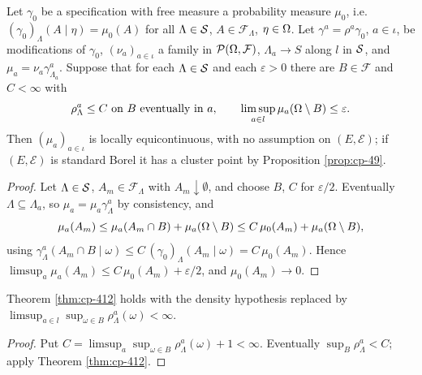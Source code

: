 \begin{theorem}[Georgii (4.12)]
    \label{thm:cp-412}
    \leanok

    Let $\gamma_0$ be a specification with free measure a probability measure $\mu_0$, i.e.\
    $(\gamma_0)_\Lambda(A \mid \eta) = \mu_0(A)$ for all $\Lambda \in \mathcal{S}$,
    $A \in \mathcal{F}_\Lambda$, $\eta \in \Omega$. Let $\gamma^a = \rho^a\gamma_0$, $a \in \iota$,
    be modifications of $\gamma_0$, $(\nu_a)_{a \in \iota}$ a family in
    $\mathcal{P}(\Omega, \mathcal{F})$, $\Lambda_a \to S$ along $l$ in $\mathcal{S}$, and
    $\mu_a = \nu_a \gamma^a_{\Lambda_a}$. Suppose that for each $\Lambda \in \mathcal{S}$ and each
    $\varepsilon > 0$ there are $B \in \mathcal{F}$ and $C < \infty$ with
    \[\rho^a_\Lambda \leq C \text{ on } B \text{ eventually in } a,
      \qquad
      \limsup_{a \in l} \mu_a(\Omega \setminus B) \leq \varepsilon.\]
    Then $(\mu_a)_{a \in \iota}$ is locally equicontinuous, with no assumption on
    $(E, \mathcal{E})$; if $(E, \mathcal{E})$ is standard Borel it has a cluster point by
    Proposition \ref{prop:cp-49}.
\end{theorem}
\begin{proof}
    \leanok

    Let $\Lambda \in \mathcal{S}$, $A_m \in \mathcal{F}_\Lambda$ with $A_m \downarrow \emptyset$, and
    choose $B$, $C$ for $\varepsilon/2$. Eventually $\Lambda \subseteq \Lambda_a$, so
    $\mu_a = \mu_a\gamma^a_\Lambda$ by consistency, and
    \[\mu_a(A_m) \leq \mu_a(A_m \cap B) + \mu_a(\Omega\setminus B)
      \leq C\,\mu_0(A_m) + \mu_a(\Omega \setminus B),\]
    using $\gamma^a_\Lambda(A_m \cap B \mid \omega) \leq C\,(\gamma_0)_\Lambda(A_m \mid \omega)
    = C\,\mu_0(A_m)$. Hence $\limsup_a \mu_a(A_m) \leq C\,\mu_0(A_m) + \varepsilon/2$, and
    $\mu_0(A_m) \to 0$.
\end{proof}

\begin{lemma}
    \label{lem:cp-412-limsup}
    \leanok

    Theorem \ref{thm:cp-412} holds with the density hypothesis replaced by
    $\limsup_{a \in l} \sup_{\omega \in B} \rho^a_\Lambda(\omega) < \infty$.
\end{lemma}
\begin{proof}
    \leanok

    Put $C = \limsup_a \sup_{\omega \in B}\rho^a_\Lambda(\omega) + 1 < \infty$. Eventually
    $\sup_B \rho^a_\Lambda < C$; apply Theorem \ref{thm:cp-412}.
\end{proof}

